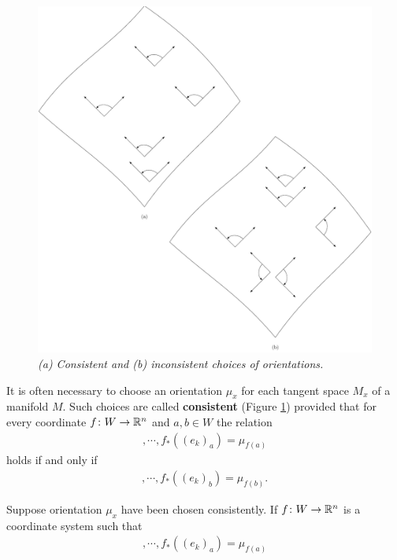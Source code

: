 \begin{figure}[!htb]
    \centering
    \includegraphics[width=.75\linewidth]{./pics/Fig5-6.pdf}
    \caption{\textit{\textup{(a)} Consistent and \textup{(b)} inconsistent choices of orientations.}}
    \label{Fig 5-6}
\end{figure}

It is often necessary to choose an orientation $\mu_x$ for each
tangent space $M_x$ of a manifold $M$. Such choices are called
\textbf{consistent} (Figure \ref{Fig 5-6}) provided 
that for every coordinate $f\colon{}W\to\mathbb{R}^n$ and $a,b\in W$ the relation 
\begin{align*}
    [f_*((e_1)_a)], \cdots, f_*((e_k)_a) = \mu_{f(a)}
\end{align*}
holds if and only if 
\begin{align*}
  [f_*((e_1)_b)], \cdots, f_*((e_k)_b) = \mu_{f(b)}.
\end{align*}

Suppose orientation $\mu_x$ have been chosen consistently. If 
$f\colon{}W\to\mathbb{R}^n$ is a coordinate system such that 
\begin{align*}
    [f_*((e_1)_a)], \cdots, f_*((e_k)_a) = \mu_{f(a)}
\end{align*}

